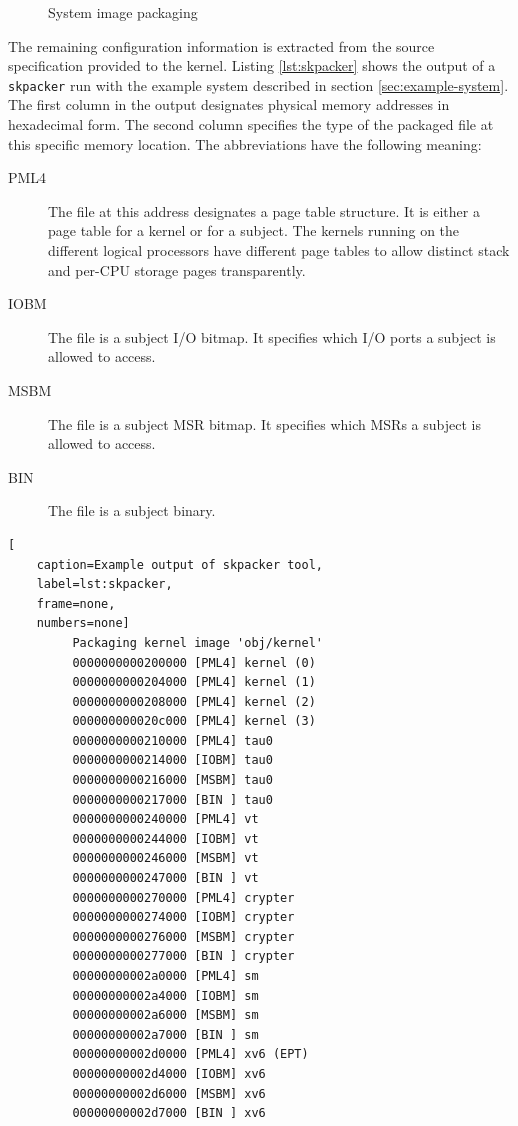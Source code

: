 \begin{figure}[h]
	\centering
	
	\caption{System image packaging}
	\label{fig:image-packaging}
\end{figure}

The remaining configuration information is extracted from the source
specification provided to the kernel. Listing \ref{lst:skpacker} shows the
output of a \texttt{skpacker} run with the example system described in section
\ref{sec:example-system}. The first column in the output designates physical
memory addresses in hexadecimal form. The second column specifies the type of
the packaged file at this specific memory location. The abbreviations have the
following meaning:

\begin{description}
	\item[PML4] The file at this address designates a page table structure. It
		is either a page table for a kernel or for a subject. The kernels
		running on the different logical processors have different page tables
		to allow distinct stack and per-CPU storage pages transparently.
	\item[IOBM] The file is a subject I/O bitmap. It specifies which I/O ports a
		subject is allowed to access.
	\item[MSBM] The file is a subject MSR bitmap. It specifies which MSRs a
		subject is allowed to access.
	\item[BIN] The file is a subject binary.
\end{description}

\begin{lstlisting}[
	caption=Example output of skpacker tool,
	label=lst:skpacker,
	frame=none,
	numbers=none]
         Packaging kernel image 'obj/kernel'
         0000000000200000 [PML4] kernel (0)
         0000000000204000 [PML4] kernel (1)
         0000000000208000 [PML4] kernel (2)
         000000000020c000 [PML4] kernel (3)
         0000000000210000 [PML4] tau0
         0000000000214000 [IOBM] tau0
         0000000000216000 [MSBM] tau0
         0000000000217000 [BIN ] tau0
         0000000000240000 [PML4] vt
         0000000000244000 [IOBM] vt
         0000000000246000 [MSBM] vt
         0000000000247000 [BIN ] vt
         0000000000270000 [PML4] crypter
         0000000000274000 [IOBM] crypter
         0000000000276000 [MSBM] crypter
         0000000000277000 [BIN ] crypter
         00000000002a0000 [PML4] sm
         00000000002a4000 [IOBM] sm
         00000000002a6000 [MSBM] sm
         00000000002a7000 [BIN ] sm
         00000000002d0000 [PML4] xv6 (EPT)
         00000000002d4000 [IOBM] xv6
         00000000002d6000 [MSBM] xv6
         00000000002d7000 [BIN ] xv6
\end{lstlisting}


